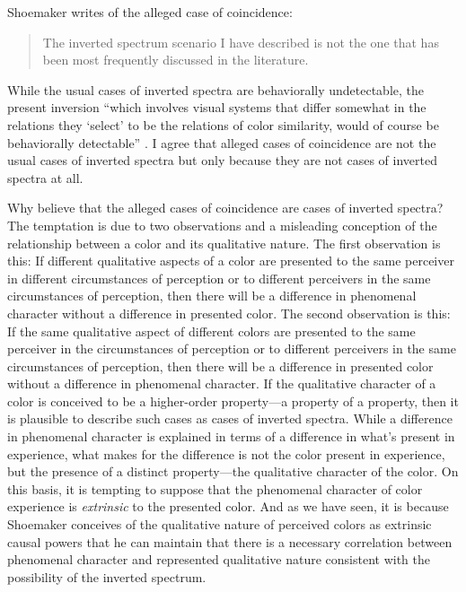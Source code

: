 \documentclass[12pt]{article}
\begin{document}

Shoemaker writes of the alleged case of coincidence: 
\begin{quote}
	The inverted spectrum scenario I have described is not the one that has been most frequently discussed in the literature. \citep[270]{Shoemaker:wk} 
\end{quote}
While the usual cases of inverted spectra are behaviorally undetectable, the present inversion ``which involves visual systems that differ somewhat in the relations they `select' to be the relations of color similarity, would of course be behaviorally detectable'' \citep[270]{Shoemaker:wk}. I agree that alleged cases of coincidence are not the usual cases of inverted spectra but only because they are not cases of inverted spectra at all.

Why believe that the alleged cases of coincidence are cases of inverted spectra? The temptation is due to two observations and a misleading conception of the relationship between a color and its qualitative nature. The first observation is this: If different qualitative aspects of a color are presented to the same perceiver in different circumstances of perception or to different perceivers in the same circumstances of perception, then there will be a difference in phenomenal character without a difference in presented color. The second observation is this: If the same qualitative aspect of different colors are presented to the same perceiver in the circumstances of perception or to different perceivers in the same circumstances of perception, then there will be a difference in presented color without a difference in phenomenal character. If the qualitative character of a color is conceived to be a higher-order property---a property of a property, then it is plausible to describe such cases as cases of inverted spectra. While a difference in phenomenal character is explained in terms of a difference in what's present in experience, what makes for the difference is not the color present in experience, but the presence of a distinct property---the qualitative character of the color. On this basis, it is tempting to suppose that the phenomenal character of color experience is \emph{extrinsic} to the presented color. And as we have seen, it is because Shoemaker conceives of the qualitative nature of perceived colors as extrinsic causal powers that he can maintain that there is a necessary correlation between phenomenal character and represented qualitative nature consistent with the possibility of the inverted spectrum.
\end{document}
